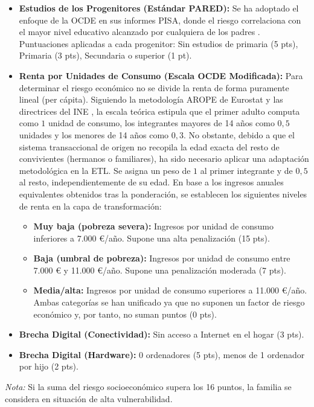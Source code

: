 \begin{itemize}
    \item \textbf{Estudios de los Progenitores (Estándar PARED):} Se ha adoptado el enfoque de la OCDE en sus informes PISA, donde el riesgo correlaciona con el mayor nivel educativo alcanzado por cualquiera de los padres \cite{OECD_PISA}. Puntuaciones aplicadas a cada progenitor: Sin estudios de primaria (5 pts), Primaria (3 pts), Secundaria o superior (1 pt).
    \item \textbf{Renta por Unidades de Consumo (Escala OCDE Modificada):} Para determinar el riesgo económico no se divide la renta de forma puramente lineal (per cápita). Siguiendo la metodología AROPE de Eurostat y las directrices del INE \cite{INE_ECV, EAPN_Pobreza}, la escala teórica estipula que el primer adulto computa como $1$ unidad de consumo, los integrantes mayores de 14 años como $0,5$ unidades y los menores de 14 años como $0,3$. No obstante, debido a que el sistema transaccional de origen no recopila la edad exacta del resto de convivientes (hermanos o familiares), ha sido necesario aplicar una adaptación metodológica en la ETL. Se asigna un peso de $1$ al primer integrante y de $0,5$ al resto, independientemente de su edad. En base a los ingresos anuales equivalentes obtenidos tras la ponderación, se establecen los siguientes niveles de renta en la capa de transformación:
    \begin{itemize}
        \item \textbf{Muy baja (pobreza severa):} Ingresos por unidad de consumo inferiores a 7.000 €/año. Supone una alta penalización (15 pts).
        \item \textbf{Baja (umbral de pobreza):} Ingresos por unidad de consumo entre 7.000 € y 11.000 €/año. Supone una penalización moderada (7 pts).
        \item \textbf{Media/alta:} Ingresos por unidad de consumo superiores a 11.000 €/año. Ambas categorías se han unificado ya que no suponen un factor de riesgo económico y, por tanto, no suman puntos (0 pts).
    \end{itemize}
    \item \textbf{Brecha Digital (Conectividad):} Sin acceso a Internet en el hogar (3 pts).
    \item \textbf{Brecha Digital (Hardware):} 0 ordenadores (5 pts), menos de 1 ordenador por hijo (2 pts).
\end{itemize}
\textit{Nota:} Si la suma del riesgo socioeconómico supera los 16 puntos, la familia se considera en situación de alta vulnerabilidad.

